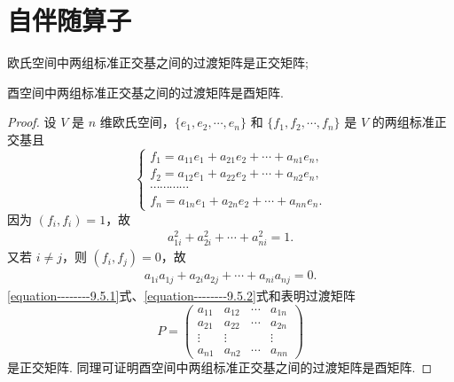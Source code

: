 \documentclass[../../main.tex]{subfiles}
\begin{document}
\section{自伴随算子}

\begin{lemma}\label{lemma:正交基之间的过渡矩阵是正交(酉)矩阵}
欧氏空间中两组标准正交基之间的过渡矩阵是正交矩阵;

酉空间中两组标准正交基之间的过渡矩阵是酉矩阵.
\end{lemma}
\begin{proof}
设 $V$ 是 $n$ 维欧氏空间，$\{e_1,e_2,\cdots,e_n\}$ 和 $\{f_1,f_2,\cdots,f_n\}$ 是 $V$ 的两组标准正交基且
\[
\begin{cases}
f_1 = a_{11}e_1 + a_{21}e_2 + \cdots + a_{n1}e_n, \\
f_2 = a_{12}e_1 + a_{22}e_2 + \cdots + a_{n2}e_n, \\
\cdots\cdots\cdots\cdots \\
f_n = a_{1n}e_1 + a_{2n}e_2 + \cdots + a_{nn}e_n.
\end{cases}
\]
因为 $(f_i,f_i) = 1$，故
\begin{align}
a_{1i}^2 + a_{2i}^2 + \cdots + a_{ni}^2 = 1.\label{equation--------9.5.1}
\end{align}
又若 $i \neq j$，则 $(f_i,f_j) = 0$，故
\begin{align}
a_{1i}a_{1j} + a_{2i}a_{2j} + \cdots + a_{ni}a_{nj} = 0.\label{equation--------9.5.2}
\end{align}
\eqref{equation--------9.5.1}式、\eqref{equation--------9.5.2}式和表明过渡矩阵
\[
P = \begin{pmatrix}
a_{11} & a_{12} & \cdots & a_{1n} \\
a_{21} & a_{22} & \cdots & a_{2n} \\
\vdots & \vdots & & \vdots \\
a_{n1} & a_{n2} & \cdots & a_{nn}
\end{pmatrix}
\]
是正交矩阵. 同理可证明酉空间中两组标准正交基之间的过渡矩阵是酉矩阵.
\end{proof}
\end{document}
